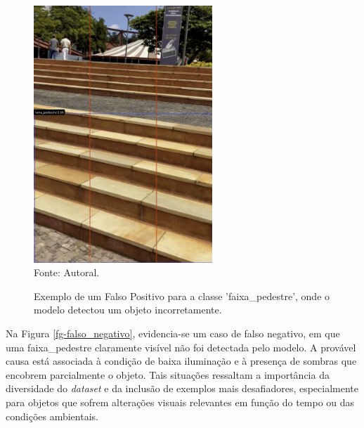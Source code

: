 \begin{figure}[htbp]
  \centering
  \caption{Exemplo de um Falso Positivo para a classe 'faixa\_pedestre', onde o modelo detectou um objeto incorretamente.}
  \includegraphics[width=0.6\textwidth]{Figuras/falso_positivo.png}
  \\
  Fonte: Autoral.
  \label{fg-falso_positivo}
\end{figure}

Na Figura \ref{fg-falso_negativo}, evidencia-se um caso de falso negativo, em que uma faixa\_pedestre claramente visível não foi detectada pelo modelo. A provável causa está associada à condição de baixa iluminação e à presença de sombras que encobrem parcialmente o objeto. Tais situações ressaltam a importância da diversidade do \textit{dataset} e da inclusão de exemplos mais desafiadores, especialmente para objetos que sofrem alterações visuais relevantes em função do tempo ou das condições ambientais.


